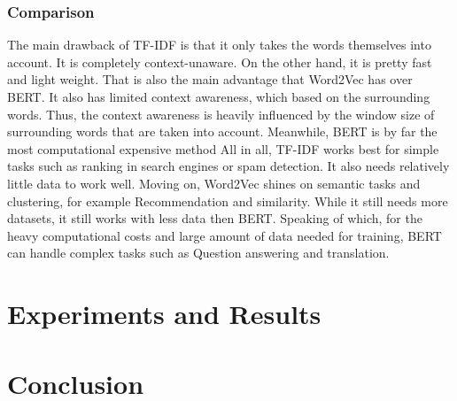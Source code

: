 \documentclass[a4paper,12pt]{article}
\begin{document}
\subsubsection{Comparison}
The main drawback of TF-IDF is that it only takes the words themselves into account. It is completely context-unaware. On the other hand, it is pretty fast and light weight. 
That is also the main advantage that Word2Vec has over BERT. It also has limited context awareness, which based on the surrounding words. Thus, the context awareness is heavily influenced by the window size of surrounding words that are taken into account. 
Meanwhile, BERT is by far the most computational expensive method
All in all, TF-IDF works best for simple tasks such as ranking in search engines or spam detection. It also needs relatively little data to work well. Moving on, Word2Vec shines on semantic tasks and clustering, for example Recommendation and similarity. While it still needs more datasets, it still works with less data then BERT. Speaking of which, for the heavy computational costs and large amount of data needed for training, BERT can handle complex tasks such as Question answering and translation.


\section{Experiments and Results}


\section{Conclusion}
\clearpage


\end{document}

